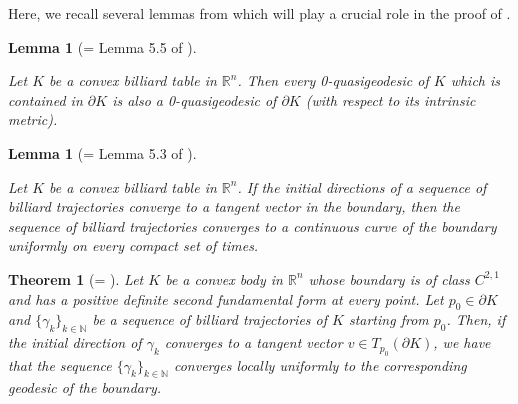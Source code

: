 \documentclass[11pt]{article}
\theoremstyle{definition}
\theoremstyle{remark}
\theoremstyle{plain}
\newtheorem{theorem}[definition]{Theorem}
\newtheorem{lemma}[definition]{Lemma}
\newcommand{\R}{\mathbb{R}}
\newcommand{\N}{\mathbb{N}}
\begin{document}
Here, we recall several lemmas from \cite{Lange} which will play a crucial role in the proof of .

\begin{lemma}[= Lemma 5.5 of \cite{Lange}]\label{lemma55}

Let $K$ be a convex billiard table in $\R^n$. Then every 0-quasigeodesic of $K$ which is contained in $\partial K$ is also a 0-quasigeodesic of $\partial K$ (with respect to its intrinsic metric).

\end{lemma}

\begin{lemma}[= Lemma 5.3 of \cite{Lange}]\label{lemma53}

Let $K$ be a convex billiard table in $\R^n$. If the initial directions of a sequence of billiard trajectories converge to a tangent vector in the boundary, then the sequence of billiard trajectories converges to a continuous curve of the boundary uniformly on every compact set of times.

\end{lemma}

\begin{theorem}[= ]

Let $K$ be a convex body in $\R^n$ whose boundary is of class $C^{2,1}$ and has a positive definite second fundamental form at every point. Let $p_0\in \partial K$ and $\{\gamma_k\}_{k\in \N}$ be a sequence of billiard trajectories of $K$ starting from $p_0$. Then, if the initial direction of $\gamma_k$ converges to a tangent vector $v\in T_{p_0}(\partial K)$, we have that the sequence $\{\gamma_k\}_{k\in \N}$ converges locally uniformly to the corresponding geodesic of the boundary.

\end{theorem}
\end{document}
